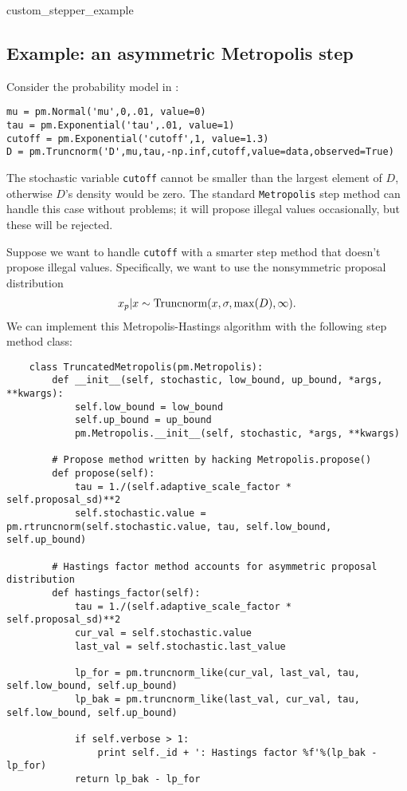 \hypertarget{custom_stepper_example}{custom_stepper_example}
\subsection*{Example: an asymmetric Metropolis step} \label{user-gen}
Consider the probability model in : 
\begin{verbatim}
mu = pm.Normal('mu',0,.01, value=0)
tau = pm.Exponential('tau',.01, value=1)
cutoff = pm.Exponential('cutoff',1, value=1.3)
D = pm.Truncnorm('D',mu,tau,-np.inf,cutoff,value=data,observed=True)
\end{verbatim}
The stochastic variable \texttt{cutoff} cannot be smaller than the largest element of $D$, otherwise $D$'s density would be zero. The standard \texttt{Metropolis} step method can handle this case without problems; it will propose illegal values occasionally, but these will be rejected. 

\medskip
Suppose we want to handle \texttt{cutoff} with a smarter step method that doesn't propose illegal values. Specifically, we want to use the nonsymmetric proposal distribution
\begin{eqnarray*}
	x_p | x \sim \textup{Truncnorm}(x, \sigma, \max(D), \infty).
\end{eqnarray*}
We can implement this Metropolis-Hastings algorithm with the following step method class:
\begin{verbatim}
	class TruncatedMetropolis(pm.Metropolis):
	    def __init__(self, stochastic, low_bound, up_bound, *args, **kwargs):
	        self.low_bound = low_bound
	        self.up_bound = up_bound
	        pm.Metropolis.__init__(self, stochastic, *args, **kwargs)

	    # Propose method written by hacking Metropolis.propose()
	    def propose(self):
	        tau = 1./(self.adaptive_scale_factor * self.proposal_sd)**2
	        self.stochastic.value = pm.rtruncnorm(self.stochastic.value, tau, self.low_bound, self.up_bound)

	    # Hastings factor method accounts for asymmetric proposal distribution    
	    def hastings_factor(self):
	        tau = 1./(self.adaptive_scale_factor * self.proposal_sd)**2
	        cur_val = self.stochastic.value
	        last_val = self.stochastic.last_value

	        lp_for = pm.truncnorm_like(cur_val, last_val, tau, self.low_bound, self.up_bound)
	        lp_bak = pm.truncnorm_like(last_val, cur_val, tau, self.low_bound, self.up_bound)   

	        if self.verbose > 1:
	            print self._id + ': Hastings factor %f'%(lp_bak - lp_for)     
	        return lp_bak - lp_for
\end{verbatim}

